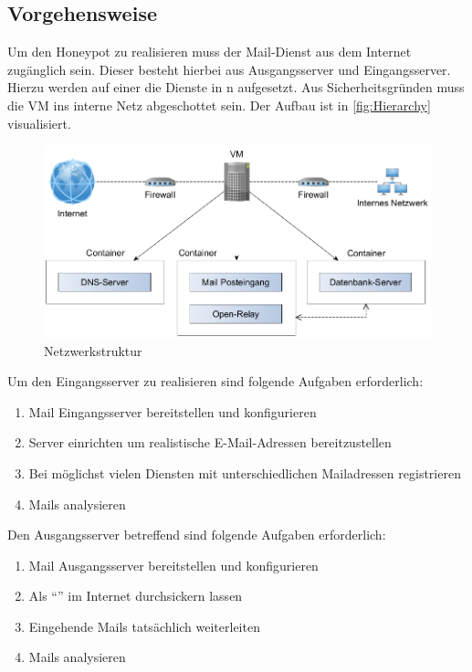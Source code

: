 \documentclass[a4paper,11pt,singlespacing]{article}
\begin{document}
	\subsection{Vorgehensweise}\label{sec:EinleitungVorgehensweise}
		Um den Honeypot zu realisieren muss der Mail-Dienst aus dem Internet zugänglich sein.
		Dieser besteht hierbei aus Ausgangsserver und Eingangsserver.
		Hierzu werden auf einer  die Dienste in n aufgesetzt.
		Aus Sicherheitsgründen muss die VM ins interne Netz abgeschottet sein.
		Der Aufbau ist in \autoref{fig:Hierarchy} visualisiert.

		\begin{figure}[H]
		\includegraphics[width=\linewidth]{2-Hierarchy.png}
		\caption{Netzwerkstruktur}
		\label{fig:Hierarchy}
		\end{figure}

		Um den Eingangsserver zu realisieren sind folgende Aufgaben erforderlich:
		\begin{enumerate}
		\item Mail Eingangsserver bereitstellen und konfigurieren
		\item {} Server einrichten um realistische E-Mail-Adressen bereitzustellen
		\item Bei möglichst vielen Diensten mit unterschiedlichen Mailadressen registrieren
		\item Mails analysieren
		\end{enumerate}

		Den Ausgangsserver betreffend sind folgende Aufgaben erforderlich:
		\begin{enumerate}
		\item Mail Ausgangsserver bereitstellen und konfigurieren
		\item Als "`"' im Internet durchsickern lassen
		\item Eingehende Mails tatsächlich weiterleiten
		\item Mails analysieren
		\end{enumerate}
\end{document}
